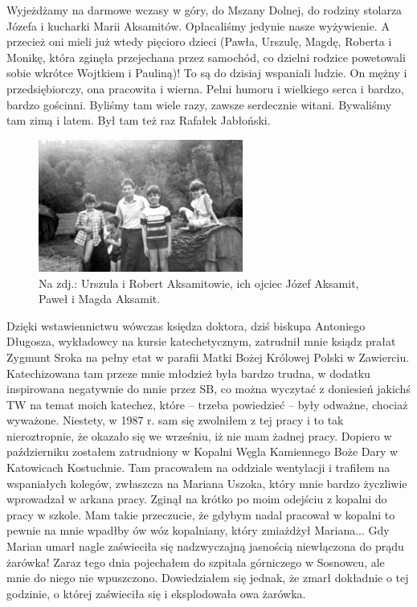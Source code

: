 Wyjeżdżamy na darmowe wczasy w góry, do Mszany Dolnej, do rodziny stolarza Józefa i kucharki Marii Aksamitów. Opłacaliśmy jedynie nasze wyżywienie. A przecież oni mieli już wtedy pięcioro dzieci (Pawła, Urszulę, Magdę, Roberta i Monikę, która zginęła przejechana przez samochód, co dzielni rodzice powetowali sobie wkrótce Wojtkiem i Pauliną)! To są do dzisiaj wspaniali ludzie. On mężny i przedsiębiorczy, ona pracowita i wierna. Pełni humoru i wielkiego serca i bardzo, bardzo gościnni. Byliśmy tam wiele razy, zawsze serdecznie witani. Bywaliśmy tam zimą i latem. Był tam też raz Rafałek Jabłoński.
\begin{figure}[!h]
\begin{center}
\includegraphics[width=0.6\textwidth]{photo/rodzina_aksamitow.jpg}
\caption[Rodzina Aksamitów]{Na zdj.: Urszula i Robert Aksamitowie, ich ojciec Józef Aksamit, Paweł i Magda Aksamit.}
\end{center}
\end{figure}

Dzięki wstawiennictwu wówczas księdza doktora, dziś biskupa Antoniego Długosza, wykładowcy na kursie katechetycznym, zatrudnił mnie ksiądz prałat Zygmunt Sroka na pełny etat w parafii Matki Bożej Królowej Polski w Zawierciu. Katechizowana tam przeze mnie młodzież była bardzo trudna, w dodatku inspirowana negatywnie do mnie przez SB, co można wyczytać z doniesień jakichś TW na temat moich katechez, które – trzeba powiedzieć – były odważne, chociaż wyważone. Niestety, w 1987 r. sam się zwolniłem z tej pracy i to tak nieroztropnie, że okazało się we wrześniu, iż nie mam żadnej pracy. Dopiero w październiku zostałem zatrudniony w Kopalni Węgla Kamiennego Boże Dary w Katowicach Kostuchnie. Tam pracowałem na oddziale wentylacji i trafiłem na wspaniałych kolegów, zwłaszcza na Mariana Uszoka, który mnie bardzo życzliwie wprowadzał w arkana pracy. Zginął na krótko po moim odejściu z kopalni do pracy w szkole. Mam takie przeczucie, że gdybym nadal pracował w kopalni to pewnie na mnie wpadłby ów wóz kopalniany, który zmiażdżył Mariana... Gdy Marian umarł nagle zaświeciła się nadzwyczajną jasnością niewłączona do prądu żarówka! Zaraz tego dnia pojechałem do szpitala górniczego w Sosnowcu, ale mnie do niego nie wpuszczono. Dowiedziałem się jednak, że zmarł dokładnie o tej godzinie, o której zaświeciła się i eksplodowała owa żarówka.

